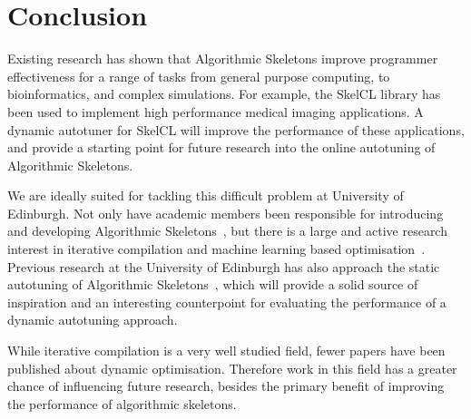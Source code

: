 \section{Conclusion}
Existing research has shown that Algorithmic Skeletons improve
programmer effectiveness for a range of tasks from general purpose
computing, to bioinformatics, and complex simulations. For example,
the SkelCL library has been used to implement high performance medical
imaging applications. A dynamic autotuner for SkelCL will improve the
performance of these applications, and provide a starting point for
future research into the online autotuning of Algorithmic Skeletons.

We are ideally suited for tackling this difficult problem at
University of Edinburgh. Not only have academic members been
responsible for introducing and developing Algorithmic
Skeletons~\cite{Cole1989, Cole2004, Benoit2005a}, but there is a large
and active research interest in iterative compilation and machine
learning based optimisation~\cite{Fursin2008, Agakov,
Fursin2005}. Previous research at the University of Edinburgh has also
approach the static autotuning of Algorithmic
Skeletons~\cite{Collins2012, Collins2013}, which will provide a solid
source of inspiration and an interesting counterpoint for evaluating
the performance of a dynamic autotuning approach.

While iterative compilation is a very well studied field, fewer papers
have been published about dynamic optimisation. Therefore work in this
field has a greater chance of influencing future research, besides the
primary benefit of improving the performance of algorithmic skeletons.


